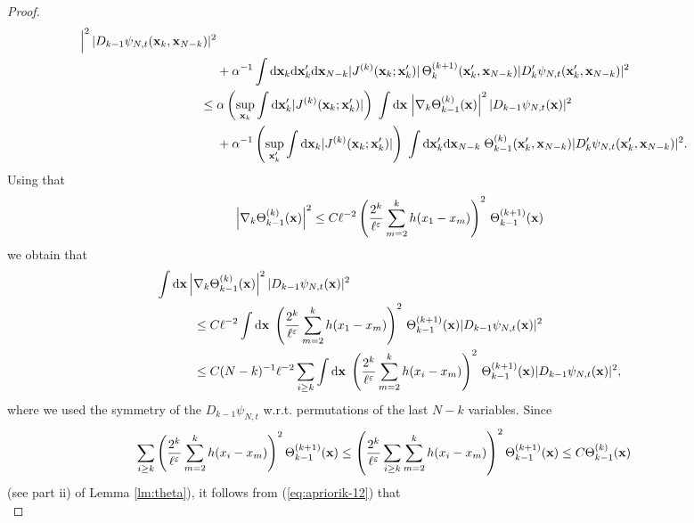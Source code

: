 \documentclass[11pt]{article}
\newcommand{\rd}{{\rm d}}
\newcommand{\eps}{\varepsilon}
\newcommand{\bx}{{\bf x}}
\renewcommand{\a}{\alpha}
\begin{document}
\begin{proof}
\begin{equation}
\begin{split}
\Big|^2 \, |D_{k-1}  \psi_{N,t} (\bx_k, \bx_{N-k})|^2\\
&+ \a^{-1} \int \rd \bx_k \rd \bx'_k \rd \bx_{N-k} |J^{(k)} (\bx_k;
\bx'_k)| \, \Theta_k^{(k+1)} (\bx'_k,\bx_{N-k}) |D'_k  \psi_{N,t}
(\bx'_k,\bx_{N-k})|^2 \\
\leq \;& \a \left( \sup_{\bx_k} \int \rd \bx'_k |J^{(k)} (\bx_k;
\bx'_k)| \right) \; \int \rd \bx \; \Big|\nabla_k \Theta_{k-1}^{(k)}
(\bx)
\Big|^2 \, |D_{k-1}  \psi_{N,t} (\bx)|^2\\
&+ \a^{-1} \left( \sup_{\bx'_k} \int \rd \bx_k |J^{(k)}
(\bx_k;\bx'_k)| \right) \; \int \rd \bx'_k \rd \bx_{N-k} \;
\Theta_{k-1}^{(k)} (\bx'_k,\bx_{N-k}) |D'_k  \psi_{N,t}
(\bx'_k,\bx_{N-k})|^2.
\end{split}
\end{equation}
Using that \begin{equation} \Big|\nabla_k \Theta_{k-1}^{(k)}(\bx)
\Big|^2 \leq C \ell^{-2} \left( \frac{2^k}{\ell^{\eps}} \sum_{m=2}^k
h (x_1 -x_m) \right)^2 \, \Theta_{k-1}^{(k+1)} (\bx)
\end{equation}
we obtain that
\begin{equation}\label{eq:apriorik-12}
\begin{split}
\int \rd \bx  \, \Big|\nabla_k &\Theta_{k-1}^{(k)} (\bx) \Big|^2 \,
|D_{k-1}  \psi_{N,t} (\bx)|^2
\\ \leq \; & C \ell^{-2} \int \rd \bx \; \left( \frac{2^k}{\ell^{\eps}} \sum_{m=2}^k h
(x_1 -x_m) \right)^2 \, \Theta_{k-1}^{(k+1)} (\bx) |D_{k-1}
\psi_{N,t} (\bx)|^2\\
\leq \; & C (N-k)^{-1} \ell^{-2} \sum_{i \geq k} \int \rd \bx \;
\left( \frac{2^k}{\ell^{\eps}} \sum_{m=2}^k h (x_i -x_m) \right)^2
\, \Theta_{k-1}^{(k+1)} (\bx) |D_{k-1}  \psi_{N,t} (\bx)|^2,
\end{split}
\end{equation}
where we used the symmetry of the $D_{k-1}  \psi_{N,t}$ w.r.t.
permutations of the last $N-k$ variables. Since
\begin{equation}
\begin{split}
\sum_{i \geq k} \left( \frac{2^k}{\ell^{\eps}} \sum_{m=2}^k h (x_i
-x_m) \right)^2 \Theta_{k-1}^{(k+1)} (\bx) &\leq \left(
\frac{2^k}{\ell^{\eps}} \sum_{i \geq k} \sum_{m=2}^k h (x_i -x_m)
\right)^2 \Theta_{k-1}^{(k+1)} (\bx)  \leq C \Theta_{k-1}^{(k)}
(\bx)
\end{split}
\end{equation}
(see part ii) of Lemma \ref{lm:theta}), it follows from
(\ref{eq:apriorik-12}) that
\begin{equation}

\end{equation}
\end{proof}
\end{document}
